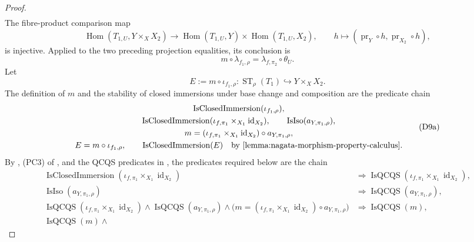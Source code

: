 \begin{proof}
\[\begin{aligned}
  \end{aligned}
  \]
  The fibre-product comparison map
  \[
    \operatorname{Hom}(T_{1,U},Y\times_XX_2)
      \longrightarrow
      \operatorname{Hom}(T_{1,U},Y)\times
      \operatorname{Hom}(T_{1,U},X_2),
    \qquad h\longmapsto
      (\operatorname{pr}_Y\circ h,\operatorname{pr}_{X_2}\circ h),
  \]
  is injective.  Applied to the two preceding projection equalities, its
  conclusion is
  \[
    m\circ\lambda_{f_1,\rho}
      =\lambda_{f,\pi_2}\circ\theta_U.                            \tag{D8}
  \]
  Let
  \[
    E:=m\circ\iota_{f_1,\rho}\colon
      \operatorname{ST}_{\rho}(T_1)\hookrightarrow Y\times_XX_2. \tag{D9}
  \]
  The definition of $m$ and the stability of closed immersions under base
  change and composition are the predicate chain
  \[
  \begin{gathered}
    \operatorname{IsClosedImmersion}(\iota_{f_1,\rho}),\\
    \operatorname{IsClosedImmersion}
      (\iota_{f,\pi_1}\times_{X_1}\operatorname{id}_{X_2}),
    \qquad \operatorname{IsIso}(a_{Y,\pi_1,\rho}),\\
    m=(\iota_{f,\pi_1}\times_{X_1}\operatorname{id}_{X_2})
        \circ a_{Y,\pi_1,\rho},\\
    E=m\circ\iota_{f_1,\rho},
    \qquad \operatorname{IsClosedImmersion}(E)
      \quad\text{by \Cref{lemma:nagata-morphism-property-calculus}}.
  \end{gathered}                                                  \tag{D9a}
  \]
  By , (PC3) of
  , and the QCQS predicates in
  , the predicates required below are the
  chain
  \[
  \begin{aligned}
    \operatorname{IsClosedImmersion}
      (\iota_{f,\pi_1}\times_{X_1}\operatorname{id}_{X_2})
      &\Longrightarrow
        \operatorname{IsQCQS}
          (\iota_{f,\pi_1}\times_{X_1}\operatorname{id}_{X_2}),\\
    \operatorname{IsIso}(a_{Y,\pi_1,\rho})
      &\Longrightarrow\operatorname{IsQCQS}(a_{Y,\pi_1,\rho}),\\
    \operatorname{IsQCQS}
      (\iota_{f,\pi_1}\times_{X_1}\operatorname{id}_{X_2})\wedge
      \operatorname{IsQCQS}(a_{Y,\pi_1,\rho})\wedge
      \bigl(m=(\iota_{f,\pi_1}\times_{X_1}\operatorname{id}_{X_2})
        \circ a_{Y,\pi_1,\rho}\bigr)
      &\Longrightarrow\operatorname{IsQCQS}(m),\\
    \operatorname{IsQCQS}(m)\wedge

\end{aligned}\]
\end{proof}
